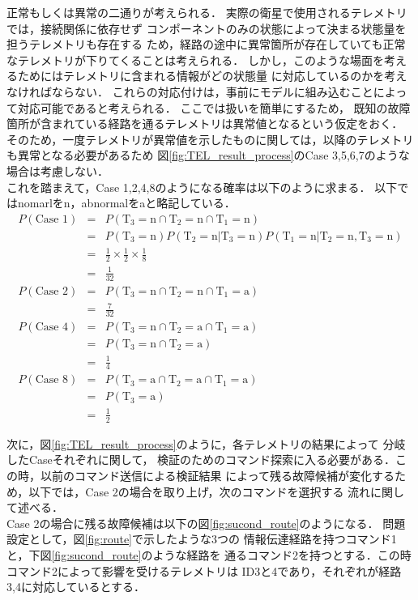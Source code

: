 \documentclass[11pt]{jsreport}
\begin{document}
正常もしくは異常の二通りが考えられる．
実際の衛星で使用されるテレメトリでは，接続関係に依存せず
コンポーネントのみの状態によって決まる状態量を担うテレメトリも存在する
ため，経路の途中に異常箇所が存在していても正常なテレメトリが下りてくることは考えられる．
しかし，このような場面を考えるためにはテレメトリに含まれる情報がどの状態量
に対応しているのかを考えなければならない．
これらの対応付けは，事前にモデルに組み込むことによって対応可能であると考えられる．
ここでは扱いを簡単にするため，
既知の故障箇所が含まれている経路を通るテレメトリは異常値となるという仮定をおく．
そのため，一度テレメトリが異常値を示したものに関しては，以降のテレメトリも異常となる必要があるため
図\ref{fig:TEL_result_process}のCase 3,5,6,7のような場合は考慮しない．\\
これを踏まえて，Case 1,2,4,8のようになる確率は以下のように求まる．
以下ではnomarlをn，abnormalをaと略記している．
\begin{eqnarray}
   P(\text{Case 1}) &=& P(\text{T}_3=\text{n}\cap\text{T}_2=\text{n}\cap
   \text{T}_1=\text{n}) \nonumber \\
    &=& P(\text{T}_3=\text{n})
   P(\text{T}_2=\text{n}|\text{T}_3=\text{n})
   P(\text{T}_1=\text{n}|\text{T}_2=\text{n},\text{T}_3=\text{n}) \nonumber \\
   &=& \frac{1}{2}\times\frac{1}{2}\times\frac{1}{8}\nonumber \\
     &=& \frac{1}{32} \\
   P(\text{Case 2})  &=& P(\text{T}_3=\text{n}\cap\text{T}_2=\text{n}\cap
   \text{T}_1=\text{a}) \nonumber \\
      &=& \frac{7}{32} \\
P(\text{Case 4})  &=& P(\text{T}_3=\text{n}\cap\text{T}_2=\text{a}\cap
   \text{T}_1=\text{a}) \nonumber \\
   &=& P(\text{T}_3=\text{n}\cap\text{T}_2=\text{a}) \nonumber\\
      &=& \frac{1}{4} \\
P(\text{Case 8})  &=& P(\text{T}_3=\text{a}\cap\text{T}_2=\text{a}\cap
   \text{T}_1=\text{a}) \nonumber \\
   &=& P(\text{T}_3=\text{a}) \nonumber\\
      &=& \frac{1}{2} 
\end{eqnarray}

次に，図\ref{fig:TEL_result_process}のように，各テレメトリの結果によって
分岐したCaseそれぞれに関して，
検証のためのコマンド探索に入る必要がある．この時，以前のコマンド送信による検証結果
によって残る故障候補が変化するため，以下では，Case 2の場合を取り上げ，次のコマンドを選択する
流れに関して述べる．\\
Case 2の場合に残る故障候補は以下の図\ref{fig:sucond_route}のようになる．
問題設定として，図\ref{fig:route}で示したような3つの
情報伝達経路を持つコマンド1と，下図\ref{fig:sucond_route}のような経路を
通るコマンド2を持つとする．この時コマンド2によって影響を受けるテレメトリは
ID3と4であり，それぞれが経路3,4に対応しているとする．
\end{document}

